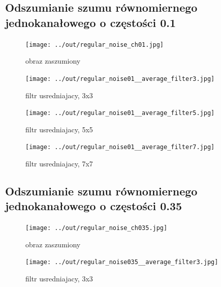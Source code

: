 \documentclass[a4paper,12pt]{article}
\begin{document}
\newpage
\subsection{Odszumianie szumu równomiernego jednokanałowego o częstości 0.1}
\begin{figure}[h!]
\begin{minipage}[t]{7.5cm}
\begin{center}
\texttt{[image: ../out/regular\_noise\_ch01.jpg]}
\caption{obraz zaszumiony}
\end{center}
\end{minipage}
\hfill
\begin{minipage}[t]{7.5cm}
\begin{center}
\texttt{[image: ../out/regular\_noise01\_\_average\_filter3.jpg]}
\caption{filtr usredniajacy, 3x3}
\end{center}
\end{minipage}
\end{figure}

\begin{figure}[h!]
\begin{minipage}[t]{7.5cm}
\begin{center}
\texttt{[image: ../out/regular\_noise01\_\_average\_filter5.jpg]}
\caption{filtr usredniajacy, 5x5}
\end{center}
\end{minipage}
\hfill
\begin{minipage}[t]{7.5cm}
\begin{center}
\texttt{[image: ../out/regular\_noise01\_\_average\_filter7.jpg]}
\caption{filtr usredniajacy, 7x7}
\end{center}
\end{minipage}
\end{figure}


\newpage
\subsection{Odszumianie szumu równomiernego jednokanałowego o częstości 0.35}
\begin{figure}[h!]
\begin{minipage}[t]{7.5cm}
\begin{center}
\texttt{[image: ../out/regular\_noise\_ch035.jpg]}
\caption{obraz zaszumiony}
\end{center}
\end{minipage}
\hfill
\begin{minipage}[t]{7.5cm}
\begin{center}
\texttt{[image: ../out/regular\_noise035\_\_average\_filter3.jpg]}
\caption{filtr usredniajacy, 3x3}
\end{center}
\end{minipage}
\end{figure}
\end{document}
